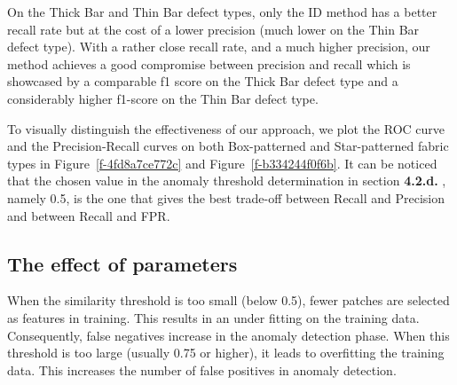 \documentclass[3p,,preprint,review,12pt]{elsarticle}
\makeatletter
\def\fixFloatSize#1{}%
\makeatother
\begin{document}
On the Thick Bar and Thin Bar defect types, only the ID method has a better recall rate but at the cost of a lower precision (much lower on the Thin Bar defect type). With a rather close recall rate, and a much higher precision, our method achieves a good compromise between precision and recall which is showcased by a comparable f1 score on the Thick Bar defect type and a considerably higher f1-score on the Thin Bar defect type.

To visually distinguish the effectiveness of our approach, we plot the ROC curve and the Precision-Recall curves on both Box-patterned and Star-patterned fabric types in Figure~\ref{f-4fd8a7ce772c} and Figure~\ref{f-b334244f0f6b}. It can be noticed that the chosen value in the anomaly threshold determination in section \textbf{4.2.d.} , namely 0.5, is the one that gives the best trade-off between Recall and Precision and between Recall and FPR.


\bgroup
\fixFloatSize{Figures/Figure11.jpg}
\begin{figure*}[!htbp]
\centering \makeatletter{}
\makeatother 
\caption{{Precision-Recall and ROC curve on the Box-patterned fabric type with 0.7 as a training threshold and different thresholds for anomaly detection (with a step of 0.1).}}
\label{f-4fd8a7ce772c}
\end{figure*}
\egroup

\bgroup
\fixFloatSize{Figures/Figure12.jpg}
\begin{figure*}[!htbp]
\centering \makeatletter{}
\makeatother 
\caption{{Precision-Recall and ROC curve on the Star-patterned fabric type with 0.7 as a training threshold and different thresholds for anomaly detection (with a step of 0.1).}}
\label{f-b334244f0f6b}
\end{figure*}
\egroup




\subsection{The effect of parameters}When the similarity threshold is too small (below 0.5), fewer patches are selected as features in training. This results in an under fitting on the training data. Consequently, false negatives increase in the anomaly detection phase. When this threshold is too large (usually 0.75 or higher), it leads to overfitting the training data. This increases the number of false positives in anomaly detection. 
\end{document}
